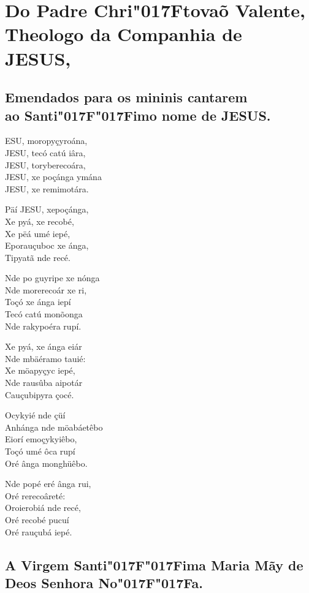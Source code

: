 \documentclass[openany,titlepage,12pt]{book}
\renewcommand{\sectionmark}[1]{\gdef\rightmark{#1}}
\newcommand{\lgS}{\char"017F}
\newcommand{\lgSS}{\char"017F\char"017F}
\begin{document}
\section{Do Padre Chri\lgS tovaõ Valente,\\Theologo da Companhia de JESUS,}
\sectionmark{Poemas Bra\lgS ilicos}

\subsection{Emendados para os mininis cantarem\\
ao Santi\lgSS imo nome de JESUS.}

\lettrine[findent =4pt, nindent=0pt, lines=5]
{}{E}SU, moropyçyroána,\\
JESU, tecó catú iâra,\\
JESU, toryberecoára,\\
JESU, xe poçánga ymána\\
JESU, xe remimotára.

Päí JESU, xepoçánga,\\
Xe pyá, xe recobé,\\
Xe pëá umé iepé,\\
Eporauçuboc xe ánga,\\
Tipyatã nde recé.

Nde po guyripe xe nónga\\
Nde morerecoár xe ri,\\
Toçó xe ánga iepí\\
Tecó catú monõonga\\%
Nde rakypoéra rupí.

Xe pyá, xe ánga eiár\\
Nde mbäéramo tauié:\\
Xe möapyçyc iepé,\\
Nde rausûba aipotár\\
Cauçubipyra çocé.

Ocykyié nde çüí\\
Anhánga nde möabáetêbo\\
Eiorí emoçykyiêbo,\\
Toçó umé ôca rupí\\
Oré ânga monghüêbo.

Nde popé eré ânga rui,\\
Oré rerecoâreté:\\
Oroierobiá nde recé,\\
Oré recobé pucuí\\
Oré rauçubá iepé.

\subsection{A Virgem Santi\lgSS ima Maria Mãy de Deos Senhora No\lgSS a.}
\end{document}
